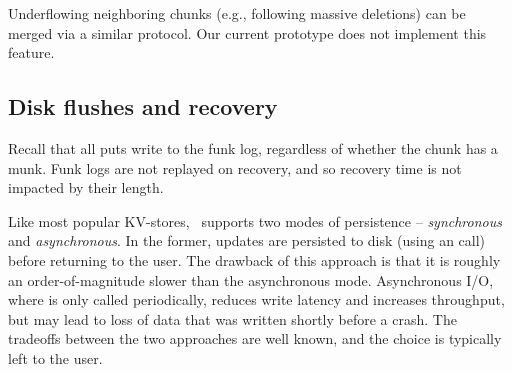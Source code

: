 
Underflowing neighboring chunks (e.g., following massive deletions) can be merged via a similar protocol. 
Our current \sys\/ prototype does not implement this feature. 

\subsection{Disk flushes and recovery}
\label{ssec:flush-recovery}

Recall that all puts write to the funk log, regardless of whether the chunk has a munk. 
Funk logs are not replayed on recovery, and so recovery time is not impacted by 
their length.

Like most popular KV-stores, \sys\ supports two modes of persistence -- \emph{synchronous} and \emph{asynchronous}. 
In the former,  updates are persisted to disk (using an  call)
before returning to the user. %
The drawback of this approach is that it is roughly an order-of-magnitude slower than the asynchronous mode.
Asynchronous I/O, where  is only called periodically, 
reduces write latency and increases throughput, but 
may lead to loss of data that was written shortly before a crash. The tradeoffs between the two approaches are 
well known, and the choice is typically left to the user.

